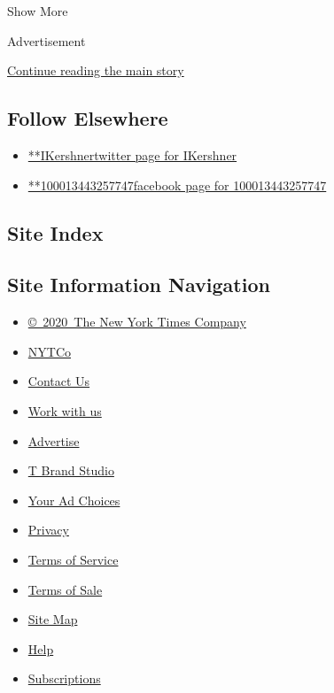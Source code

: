 Show More

Advertisement

\protect\hyperlink{after-mid2}{Continue reading the main story}

\hypertarget{follow-elsewhere}{%
\subsection{Follow Elsewhere}\label{follow-elsewhere}}

\begin{itemize}
\tightlist
\item
  \href{https://twitter.com/IKershner}{**IKershnertwitter page for
  IKershner}
\item
  \href{https://www.facebook.com/100013443257747}{**100013443257747facebook
  page for 100013443257747}
\end{itemize}

\hypertarget{site-index}{%
\subsection{Site Index}\label{site-index}}

\hypertarget{site-information-navigation}{%
\subsection{Site Information
Navigation}\label{site-information-navigation}}

\begin{itemize}
\tightlist
\item
  \href{https://help.nytimes.com/hc/en-us/articles/115014792127-Copyright-notice}{©~2020~The
  New York Times Company}
\end{itemize}

\begin{itemize}
\tightlist
\item
  \href{https://www.nytco.com/}{NYTCo}
\item
  \href{https://help.nytimes.com/hc/en-us/articles/115015385887-Contact-Us}{Contact
  Us}
\item
  \href{https://www.nytco.com/careers/}{Work with us}
\item
  \href{https://nytmediakit.com/}{Advertise}
\item
  \href{http://www.tbrandstudio.com/}{T Brand Studio}
\item
  \href{https://www.nytimes.com/privacy/cookie-policy\#how-do-i-manage-trackers}{Your
  Ad Choices}
\item
  \href{https://www.nytimes.com/privacy}{Privacy}
\item
  \href{https://help.nytimes.com/hc/en-us/articles/115014893428-Terms-of-service}{Terms
  of Service}
\item
  \href{https://help.nytimes.com/hc/en-us/articles/115014893968-Terms-of-sale}{Terms
  of Sale}
\item
  \href{https://spiderbites.nytimes.com}{Site Map}
\item
  \href{https://help.nytimes.com/hc/en-us}{Help}
\item
  \href{https://www.nytimes.com/subscription?campaignId=37WXW}{Subscriptions}
\end{itemize}
